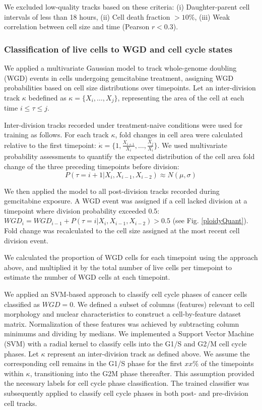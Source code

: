 \documentclass[11pt,notitlepage]{article}
\begin{document}
We excluded low-quality tracks based on these criteria: (i) Daughter-parent cell intervals of less than 18 hours, (ii) Cell death fraction \( > 10\% \), (iii) Weak correlation between cell size and time (Pearson \( r < 0.3 \)).

\subsubsection*{Classification of live cells to WGD and cell cycle states}

We applied a multivariate Gaussian model to track whole-genome doubling (WGD) events in cells undergoing gemcitabine treatment, assigning WGD probabilities based on cell size distributions over timepoints. Let an inter-division track $\kappa$ bedefined as \( \kappa = \{X_{i}, \dots, X_{j}\} \), representing the area of the cell at each time $i \leq \tau \leq j$.

Inter-division tracks recorded under treatment-naive conditions were used for training as follows. For each track \( \kappa \), fold changes in cell area were calculated relative to the first timepoint: $\dot{\kappa} = \{1, \frac{X_{i+1}}{X_i},\dots,\frac{ X_j}{ X_i}\}$. We used multivariate probability assessments to quantify the expected distribution of the cell area fold change of the three preceding timepoints before division:
\begin{equation}
    P(\tau = i+1 | {X_{i}, X_{i-1},X_{i-2}} ) \approx N(\mu, \sigma)
\end{equation}

We then applied the model to all post-division tracks recorded during gemcitabine exposure. A WGD event was assigned if a cell lacked division at a timepoint where division probability exceeded 0.5:
$WGD_i = WGD_{i-1} + P(\tau = i | {X_{i}, X_{i-1},X_{i-2}} )>0.5$ (see Fig. \ref{ploidyQuant}). Fold change was recalculated to the cell size assigned at the most recent cell division event.

 We calculated the proportion of WGD cells for each timepoint using the approach above, and multiplied it by the total number of live cells per timepoint to estimate the number of WGD cells at each timepoint.

We applied an SVM-based approach to classify cell cycle phases of cancer cells classified as $WGD=0$. We defined a subset of columns (features) relevant to cell morphology and nuclear characteristics to construct a cell-by-feature dataset matrix. Normalization of these features was achieved by subtracting column minimums and dividing by medians.
We implemented a Support Vector Machine (SVM) with a radial kernel to classify cells into the G1/S and G2/M cell cycle phases. Let $\kappa$ represent an inter-division track as defined above. We assume the corresponding cell remains in the G1/S phase for the first \( xx\% \) of the timepoints within \( \kappa \), transitioning into the G2M phase thereafter. This assumption provided the necessary labels for cell cycle phase classification. The trained classifier was subsequently applied to classify cell cycle phases in both post- and pre-division cell tracks.
\end{document}
